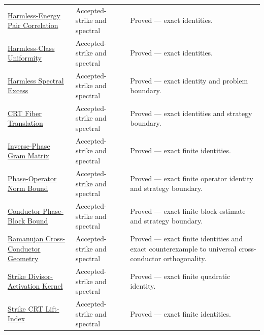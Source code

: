 {\begin{longtable}{>{\raggedright\arraybackslash}p{}>{\raggedright\arraybackslash}p{}>{\raggedright\arraybackslash}p{}}
\href{https://github.com/thiagomata/prime-numbers/blob/master/properties/sieve-sequence/harmless-energy-fixed-set-pair-form.md}{Harmless-Energy Pair Correlation} & Accepted-strike and spectral & Proved --- exact identities.\\
\href{https://github.com/thiagomata/prime-numbers/blob/master/properties/sieve-sequence/complete-period-harmless-class-uniformity.md}{Harmless-Class Uniformity} & Accepted-strike and spectral & Proved --- exact identities.\\
\href{https://github.com/thiagomata/prime-numbers/blob/master/properties/sieve-sequence/harmless-energy-spectral-excess.md}{Harmless Spectral Excess} & Accepted-strike and spectral & Proved --- exact identity and problem boundary.\\
\href{https://github.com/thiagomata/prime-numbers/blob/master/properties/sieve-sequence/harmless-class-crt-translated-fibers.md}{CRT Fiber Translation} & Accepted-strike and spectral & Proved --- exact identities and strategy boundary.\\
\href{https://github.com/thiagomata/prime-numbers/blob/master/properties/sieve-sequence/centered-inverse-phase-gram-matrix.md}{Inverse-Phase Gram Matrix} & Accepted-strike and spectral & Proved --- exact finite identities.\\
\href{https://github.com/thiagomata/prime-numbers/blob/master/properties/sieve-sequence/centered-phase-operator-norm-boundary.md}{Phase-Operator Norm Bound} & Accepted-strike and spectral & Proved --- exact finite operator identity and strategy boundary.\\
\href{https://github.com/thiagomata/prime-numbers/blob/master/properties/sieve-sequence/exact-conductor-phase-block-operator-bound.md}{Conductor Phase-Block Bound} & Accepted-strike and spectral & Proved --- exact finite block estimate and strategy boundary.\\
\href{https://github.com/thiagomata/prime-numbers/blob/master/properties/sieve-sequence/centered-ramanujan-cross-conductor-geometry.md}{Ramanujan Cross-Conductor Geometry} & Accepted-strike and spectral & Proved --- exact finite identities and exact counterexample to universal cross-conductor orthogonality.\\
\href{https://github.com/thiagomata/prime-numbers/blob/master/properties/sieve-sequence/accepted-strike-divisor-activation-kernel.md}{Strike Divisor-Activation Kernel} & Accepted-strike and spectral & Proved --- exact finite quadratic identity.\\
\href{https://github.com/thiagomata/prime-numbers/blob/master/properties/sieve-sequence/accepted-strike-crt-lift-index-transform.md}{Strike CRT Lift-Index} & Accepted-strike and spectral & Proved --- exact finite identities.\\

\end{longtable}}
